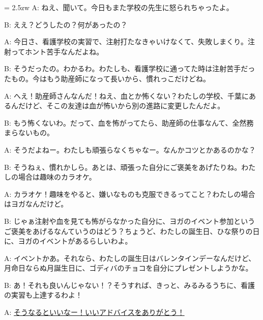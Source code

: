 \documentclass[11pt]{amsart}
\title{}
\author{}
\newenvironment{hangall}[1]{\hangindent = 2.5zw\everypar{\hangindent = 2.5zw}}{}
\begin{document}
\maketitle
\begin{hangall}{}%
A: ねえ、聞いて。今日もまた学校の先生に怒られちゃったよ。

B: ええ？どうしたの？何があったの？

A: 今日さ、看護学校の実習で、注射打たなきゃいけなくて、失敗しまくり。注射ってホント苦手なんだよね。

B: そうだったの。わかるわ。わたしも、看護学校に通ってた時は注射苦手だったもの。今はもう助産師になって長いから、慣れっこだけどね。

A: へえ！助産師さんなんだ！ねえ、血とか怖くない？わたしの学校、千葉にあるんだけど、そこの友達は血が怖いから別の進路に変更したんだよ。

B: もう怖くないわ。だって、血を怖がってたら、助産師の仕事なんて、全然務まらないもの。

A: そうだよねー。わたしも頑張らなくちゃなー。なんかコツとかあるのかな？

B: そうねぇ、慣れかしら。あとは、頑張った自分にご褒美をあげたりね。わたしの場合は趣味のカラオケ。

A: カラオケ！趣味をやると、嫌いなものも克服できるってこと？わたしの場合はヨガなんだけど。

B: じゃぁ注射や血を見ても怖がらなかった自分に、ヨガのイベント参加というご褒美をあげるなんていうのはどう？ちょうど、わたしの誕生日、ひな祭りの日に、ヨガのイベントがあるらしいわよ。

A: イベントかあ。それなら、わたしの誕生日はバレンタインデーなんだけど、月命日ならぬ月誕生日に、ゴディバのチョコを自分にプレゼントしようかな。

B: あ！それも良いんじゃない！？そうすれば、きっと、みるみるうちに、看護の実習も上達するわよ！

A: \ul{そうなるといいなー！いいアドバイスをありがとう！}\end{hangall}
\end{document}
